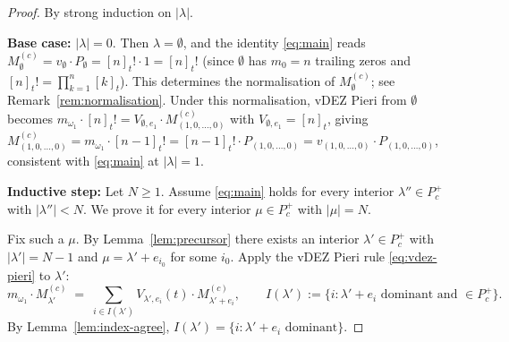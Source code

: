 \documentclass[11pt]{article}
\theoremstyle{definition}
\newcommand{\Pcp}{P_c^+}
\begin{document}
\begin{proof}
By strong induction on $|\lambda|$.

\textbf{Base case:} $|\lambda| = 0$. Then $\lambda = \emptyset$, and the
identity \eqref{eq:main} reads
$M^{(c)}_\emptyset = v_\emptyset \cdot P_\emptyset = [n]_t! \cdot 1 = [n]_t!$
(since $\emptyset$ has $m_0 = n$ trailing zeros and $[n]_t! =
\prod_{k=1}^n [k]_t$). This determines the normalisation of
$M^{(c)}_\emptyset$; see Remark~\ref{rem:normalisation}. Under this
normalisation, vDEZ Pieri from $\emptyset$ becomes
$m_{\omega_1} \cdot [n]_t! = V_{\emptyset, e_1} \cdot M^{(c)}_{(1,0,\ldots,0)}$
with $V_{\emptyset, e_1} = [n]_t$, giving
$M^{(c)}_{(1,0,\ldots,0)} = m_{\omega_1} \cdot [n-1]_t! =
[n-1]_t! \cdot P_{(1,0,\ldots,0)} = v_{(1,0,\ldots,0)} \cdot P_{(1,0,\ldots,0)}$,
consistent with \eqref{eq:main} at $|\lambda| = 1$.

\textbf{Inductive step:} Let $N \ge 1$. Assume \eqref{eq:main} holds for
every interior $\lambda'' \in \Pcp$ with $|\lambda''| < N$. We prove it for
every interior $\mu \in \Pcp$ with $|\mu| = N$.

Fix such a $\mu$. By Lemma~\ref{lem:precursor} there exists an interior
$\lambda' \in \Pcp$ with $|\lambda'| = N - 1$ and $\mu = \lambda' + e_{i_0}$
for some $i_0$. Apply the vDEZ Pieri rule \eqref{eq:vdez-pieri} to $\lambda'$:
\begin{equation}
m_{\omega_1} \cdot M^{(c)}_{\lambda'}
\;=\; \sum_{i \in I(\lambda')} V_{\lambda', e_i}(t)\cdot M^{(c)}_{\lambda' + e_i},
\qquad I(\lambda') := \{i : \lambda' + e_i \text{ dominant and }\in \Pcp\}.
\label{eq:pieri-lam}
\end{equation}
By Lemma~\ref{lem:index-agree}, $I(\lambda') = \{i : \lambda' + e_i \text{ dominant}\}$.


\end{proof}
\end{document}

